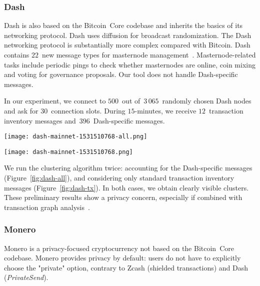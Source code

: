 \subsubsection{Dash}

Dash is also based on the Bitcoin~Core codebase and inherits the basics of its networking protocol.
Dash uses diffusion for broadcast randomization.
The Dash networking protocol is substantially more complex compared with Bitcoin.
Dash contains $22$~new message types for masternode management~\cite{Schinzel2015}.
Masternode-related tasks include periodic pings to check whether masternodes are online, coin mixing and voting for governance proposals.
Our tool does not handle Dash-specific messages.

In our experiment, we connect to $500$~out of~$3\,065$~randomly chosen Dash nodes and ask for $30$~connection slots.
During $15$-minutes, we receive $12$~transaction inventory messages and~$396$~Dash-specific messages.

\begin{figure*}
	\centering
	\begin{minipage}{0.5\textwidth}
		\centering
		\texttt{[image: dash-mainnet-1531510768-all.png]}
		\caption{Transaction clustering for Dash (messages and transactions).}
		\label{fig:dash-all}
	\end{minipage}\hfill
	\begin{minipage}{0.5\textwidth}
		\centering
		\texttt{[image: dash-mainnet-1531510768.png]}
		\caption{Transaction clustering for Dash (transactions only).}
		\label{fig:dash-tx}
	\end{minipage}\hfill
\end{figure*}

We run the clustering algorithm twice: accounting for the Dash-specific messages (Figure~\ref{fig:dash-all}), and considering only standard transaction inventory messages (Figure~\ref{fig:dash-tx}).
In both cases, we obtain clearly visible clusters.
These preliminary results show a privacy concern, especially if combined with transaction graph analysis~\cite{Kalodner2017}. 


\subsubsection{Monero}

Monero is a privacy-focused cryptocurrency not based on the Bitcoin~Core codebase.
Monero provides privacy by default: users do not have to explicitly choose the "private" option, contrary to Zcash (shielded transactions) and Dash (\textit{PrivateSend}).

